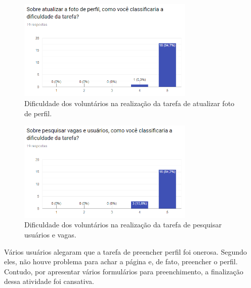 \begin{figure}[h]
    \caption{Dificuldade dos voluntários na realização da tarefa de atualizar foto de perfil.}
       	\begin{center}
            \includegraphics[width=0.75\textwidth]{figuras/avaliacao/pdv-1.png}
        \end{center}
    \label{avalGrafTUPerfil}
\end{figure} 

\begin{figure}[H]
    \caption{Dificuldade dos voluntários na realização da tarefa de pesquisar usuários e vagas.}
       	\begin{center}
            \includegraphics[width=0.75\textwidth]{figuras/avaliacao/pdv-5.png}
        \end{center}
    \label{avalGrafTUPesquisar}
\end{figure} 


Vários usuários alegaram que a tarefa de preencher perfil foi onerosa. Segundo eles, não houve problema para achar a página e, de fato, preencher o perfil. Contudo, por apresentar vários formulários para preenchimento, a finalização dessa atividade foi cansativa.

